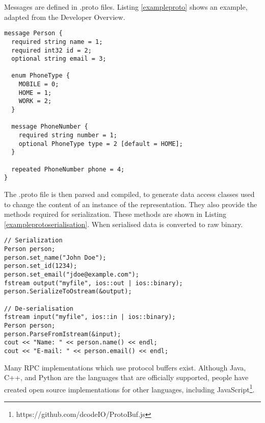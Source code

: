 \begin{description}
	Messages are defined in .proto files. Listing \ref{exampleproto} shows an example, adapted from the Developer Overview.
	~\\

	\begin{lstlisting}
message Person {
  required string name = 1;
  required int32 id = 2;
  optional string email = 3;

  enum PhoneType {
    MOBILE = 0;
    HOME = 1;
    WORK = 2;
  }

  message PhoneNumber {
    required string number = 1;
    optional PhoneType type = 2 [default = HOME];
  }

  repeated PhoneNumber phone = 4;
}
	\end{lstlisting}

	The .proto file is then parsed and compiled, to generate data access classes used to change the content of an instance of the representation. They also provide the methods required for serialization. These methods are shown in Listing \ref{exampleprotoserialisation}. When serialised data is converted to raw binary.

	\begin{lstlisting}
// Serialization
Person person;
person.set_name("John Doe");
person.set_id(1234);
person.set_email("jdoe@example.com");
fstream output("myfile", ios::out | ios::binary);
person.SerializeToOstream(&output);

// De-serialisation 
fstream input("myfile", ios::in | ios::binary);
Person person;
person.ParseFromIstream(&input);
cout << "Name: " << person.name() << endl;
cout << "E-mail: " << person.email() << endl;
	\end{lstlisting}


	Many RPC implementations which use protocol buffers exist. Although Java, C++, and Python are the languages that are officially supported, people have created open source  implementations for other languages, including JavaScript\footnote{https://github.com/dcodeIO/ProtoBuf.js}.
\end{description}

